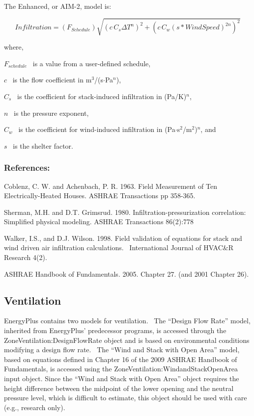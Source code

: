 The Enhanced, or AIM-2, model is:

\begin{equation}
Infiltration = \left( {{F_{Schedule}}} \right)\sqrt {{{\left( {c\,{C_s}\Delta {T^n}} \right)}^2} + {{\left( {c\,{C_w}{{\left( {s * WindSpeed} \right)}^{2n}}} \right)}^2}}
\end{equation}

where,

\({F_{schedule}}\) ~is a value from a user-defined schedule,

\(c\) ~is the flow coefficient in m\(^{3}\)/(s$\cdot$Pa\(^{n}\)),

\({C_s}\) ~is the coefficient for stack-induced infiltration in (Pa/K)\(^{n}\),

\(n\) ~is the pressure exponent,

\({C_w}\) ~is the coefficient for wind-induced infiltration in (Pa$\cdot$s\(^{2}\)/m\(^{2}\))\(^{n}\), and

\(s\) ~is the shelter factor.

\subsubsection{References:}\label{references-031}

Coblenz, C. W. and Achenbach, P. R. 1963. Field Measurement of Ten Electrically-Heated Houses. ASHRAE Transactions pp 358-365.

Sherman, M.H. and D.T. Grimsrud. 1980. Infiltration-pressurization correlation: Simplified physical modeling. ASHRAE Transactions 86(2):778

Walker, I.S., and D.J. Wilson. 1998. Field validation of equations for stack and wind driven air infiltration calculations.~ International Journal of HVAC\&R Research 4(2).

ASHRAE Handbook of Fundamentals. 2005. Chapter 27. (and 2001 Chapter 26).

\subsection{Ventilation}\label{ventilation}

EnergyPlus contains two models for ventilation.~ The ``Design Flow Rate'' model, inherited from EnergyPlus' predecessor programs, is accessed through the ZoneVentilation:DesignFlowRate object and is based on environmental conditions modifying a design flow rate.~ The ``Wind and Stack with Open Area'' model, based on equations defined in Chapter 16 of the 2009 ASHRAE Handbook of Fundamentals, is accessed using the ZoneVentilation:WindandStackOpenArea input object. Since the ``Wind and Stack with Open Area'' object requires the height difference between the midpoint of the lower opening and the neutral pressure level, which is difficult to estimate, this object should be used with care (e.g., research only).

